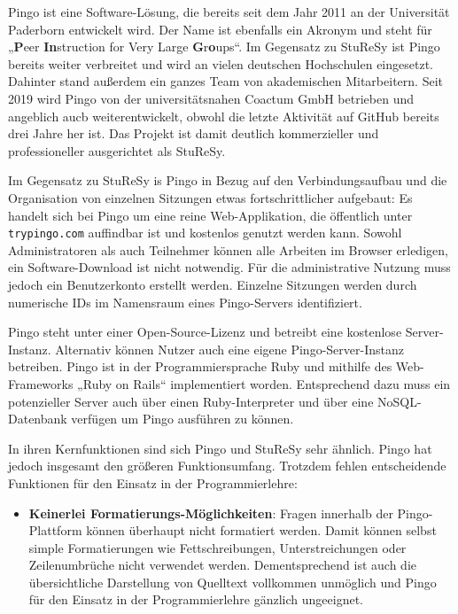 Pingo ist eine Software-Lösung, die bereits seit dem Jahr 2011 an der Universität Paderborn entwickelt wird. Der Name ist ebenfalls ein Akronym und steht für „\textbf{P}eer \textbf{In}struction for Very Large \textbf{G}r\textbf{o}ups“. Im Gegensatz zu StuReSy ist Pingo bereits weiter verbreitet und wird an vielen deutschen Hochschulen eingesetzt. Dahinter stand außerdem ein ganzes Team von akademischen Mitarbeitern. Seit 2019 wird Pingo von der universitätsnahen Coactum GmbH betrieben und angeblich aucb weiterentwickelt, obwohl die letzte Aktivität auf GitHub bereits drei Jahre her ist. Das Projekt ist damit deutlich kommerzieller und professioneller ausgerichtet als StuReSy.

Im Gegensatz zu StuReSy is Pingo in Bezug auf den Verbindungsaufbau und die Organisation von einzelnen Sitzungen etwas fortschrittlicher aufgebaut: Es handelt sich bei Pingo um eine reine Web-Applikation, die öffentlich unter \texttt{trypingo.com} auffindbar ist und kostenlos genutzt werden kann. Sowohl Administratoren als auch Teilnehmer können alle Arbeiten im Browser erledigen, ein Software-Download ist nicht notwendig. Für die administrative Nutzung muss jedoch ein Benutzerkonto erstellt werden. Einzelne Sitzungen werden durch numerische IDs im Namensraum eines Pingo-Servers identifiziert.


Pingo steht unter einer Open-Source-Lizenz und betreibt eine kostenlose Server-Instanz. Alternativ können Nutzer auch eine eigene Pingo-Server-Instanz betreiben. Pingo ist in der Programmiersprache Ruby und mithilfe des Web-Frameworks „Ruby on Rails“ implementiert worden. Entsprechend dazu muss ein potenzieller Server auch über einen Ruby-Interpreter und über eine NoSQL-Datenbank verfügen um Pingo ausführen zu können.

In ihren Kernfunktionen sind sich Pingo und StuReSy sehr ähnlich. Pingo hat jedoch insgesamt den größeren Funktionsumfang. Trotzdem fehlen entscheidende Funktionen für den Einsatz in der Programmierlehre:
\begin{itemize}
    \item \textbf{Keinerlei Formatierungs-Möglichkeiten}: Fragen innerhalb der Pingo-Plattform können überhaupt nicht formatiert werden. Damit können selbst simple Formatierungen wie Fettschreibungen, Unterstreichungen oder Zeilenumbrüche nicht verwendet werden. Dementsprechend ist auch die übersichtliche Darstellung von Quelltext vollkommen unmöglich und Pingo für den Einsatz in der Programmierlehre gänzlich ungeeignet.
\end{itemize}

